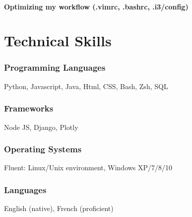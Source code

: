\documentclass{article}
\begin{document}
\paragraph{Optimizing my workflow (.vimrc, .bashrc, .i3/config)}


\section{Technical Skills}

\subsubsection{Programming Languages}
\hfill Python, Javascript, Java, Html, CSS, Bash, Zsh, SQL

\subsubsection{Frameworks}
\hfill Node JS, Django, Plotly

\subsubsection{Operating Systems}
\hfill Fluent: Linux/Unix environment, Windows XP/7/8/10

\subsubsection{Languages}
\hfill English (native), French (proficient)
\end{document}
